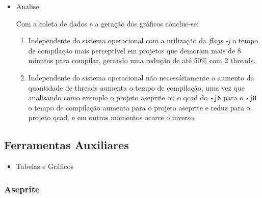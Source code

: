 \begin{itemize}
    \item Analise

    Com a coleta de dados e a geração dos gráficos conclue-se:
    
    \begin{enumerate}
        \item Independente do sistema operacional com a utilização da \textit{flags -j}
 o tempo de compilação mais perceptível em projetos que demoram mais de 8 minutos para compilar,
 gerando uma redução de até 50\% com 2 threads.
        \item Independente do sistema operacional não necessáriamente o aumento
 da quantidade de threads aumenta o tempo de compilação, uma vez que analisando
 como exemplo o projeto aseprite ou o qcad do \texttt{-j6} para o \texttt{-j8} o tempo de compilação
 aumenta para o projeto aseprite e reduz para o projeto qcad, e em outros
 momentos ocorre o inverso.
    \end{enumerate}
\end{itemize}

\clearpage
\subsection{Ferramentas Auxiliares}

\begin{itemize}
    \item Tabelas e Gráficos
\end{itemize}

\subsubsection*{Aseprite}

